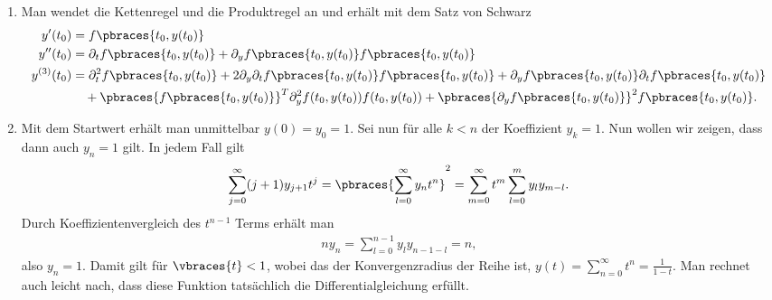 \begin{solution}
    \begin{enumerate}[label = \alph*)]
        \item Man wendet die Kettenregel und die Produktregel an und erhält mit dem Satz von Schwarz
        \begin{align*}
            y^\prime(t_0) &= f\pbraces{t_0, y(t_0)} \\
            y^{\prime\prime}(t_0) &= \partial_t f\pbraces{t_0, y(t_0)} + \partial_y f\pbraces{t_0, y(t_0)} f\pbraces{t_0, y(t_0)} \\
            y^{(3)}(t_0) &= \partial_t^2 f\pbraces{t_0, y(t_0)} + 2 \partial_y \partial_t f\pbraces{t_0,y(t_0)} f\pbraces{t_0, y(t_0)} + \partial_y f\pbraces{t_0, y(t_0)} \partial_t f\pbraces{t_0,y(t_0)} \\
            & \quad + \pbraces{f\pbraces{t_0, y(t_0)}}^T \partial_y^2 f(t_0, y(t_0)) f(t_0, y(t_0)) + \pbraces{\partial_y f\pbraces{t_0, y(t_0)}}^2 f\pbraces{t_0, y(t_0)} .
        \end{align*} 

        \item Mit dem Startwert erhält man unmittelbar $y(0) = y_0 = 1$. Sei nun für alle $k < n$ der Koeffizient $y_k = 1$. Nun wollen wir zeigen, dass dann auch $y_n = 1$ gilt. In jedem Fall gilt 
        \begin{align*}
            \sum_{j = 0}^\infty (j+1) y_{j + 1} t^j = \pbraces{\sum_{l = 0}^\infty y_n t^n}^2 = \sum_{m = 0}^\infty t^m \sum_{l = 0}^m y_l y_{m-l} .
        \end{align*}
        Durch Koeffizientenvergleich des $t^{n-1}$ Terms erhält man 
        \begin{align*}
            n y_n = \sum_{l = 0}^{n - 1} y_l y_{n - 1 -l} = n ,
        \end{align*}
        also $y_n = 1$. Damit gilt für $\vbraces{t} < 1$, wobei das der Konvergenzradius der Reihe ist, $y(t) = \sum_{n = 0}^\infty t^n = \frac{1}{1 - t}$. Man rechnet auch leicht nach, dass diese Funktion tatsächlich die Differentialgleichung erfüllt.
    \end{enumerate}
\end{solution}